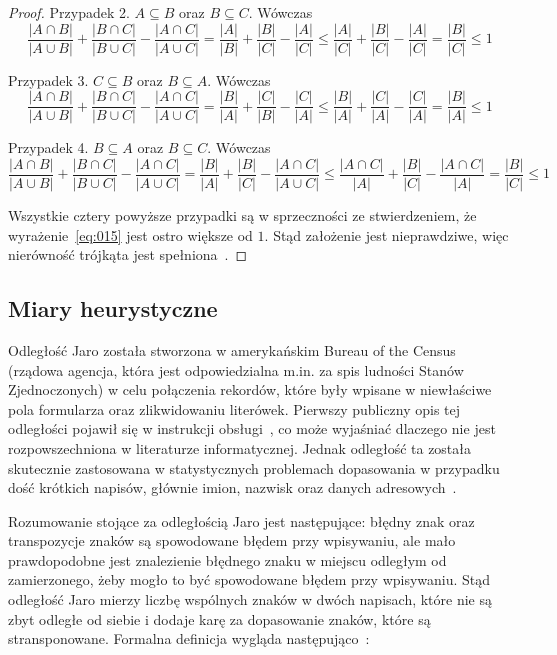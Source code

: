 \documentclass{praca1}
\begin{document}
\begin{proof}
Przypadek 2. $A\subseteq B$ oraz $B \subseteq C$. Wówczas
$$
\frac{|A\cap B|}{|A\cup B|} + \frac{|B\cap C|}{|B\cup C|} - \frac{|A\cap C|}{|A\cup C|} = 
\frac{|A|}{|B|} + \frac{|B|}{|C|} - \frac{|A|}{|C|} \leq 
\frac{|A|}{|C|} + \frac{|B|}{|C|} - \frac{|A|}{|C|} = 
\frac{|B|}{|C|} \leq 1
$$

Przypadek 3. $C\subseteq B$ oraz $B \subseteq A$. Wówczas
$$
\frac{|A\cap B|}{|A\cup B|} + \frac{|B\cap C|}{|B\cup C|} - \frac{|A\cap C|}{|A\cup C|} = 
\frac{|B|}{|A|} + \frac{|C|}{|B|} - \frac{|C|}{|A|} \leq 
\frac{|B|}{|A|} + \frac{|C|}{|A|} - \frac{|C|}{|A|} =
\frac{|B|}{|A|} \leq 1
$$

Przypadek 4. $B\subseteq A$ oraz $B \subseteq C$. Wówczas
$$
\frac{|A\cap B|}{|A\cup B|} + \frac{|B\cap C|}{|B\cup C|} - \frac{|A\cap C|}{|A\cup C|} = 
\frac{|B|}{|A|} + \frac{|B|}{|C|} - \frac{|A\cap C|}{|A\cup C|} \leq 
\frac{|A \cap C|}{|A|} + \frac{|B|}{|C|} - \frac{|A\cap C|}{|A|} =
\frac{|B|}{|C|} \leq 1
$$

Wszystkie cztery powyższe przypadki są w sprzeczności ze stwierdzeniem, że wyrażenie~\eqref{eq:015} jest ostro większe od $1$. Stąd założenie jest nieprawdziwe, więc nierówność trójkąta jest spełniona~\cite{Wilbik2012:distance}.
\end{proof}

\subsection{Miary heurystyczne}


Odległość Jaro została stworzona w amerykańskim Bureau of the Census (rządowa agencja, która jest odpowiedzialna m.in. za spis ludności Stanów Zjednoczonych) w celu połączenia rekordów, które były wpisane w niewłaściwe pola formularza oraz zlikwidowaniu literówek. Pierwszy publiczny opis tej odległości pojawił się w instrukcji obsługi~\cite{Jaro1978:usermanual}, co może wyjaśniać dlaczego nie jest rozpowszechniona w literaturze informatycznej. Jednak odległość ta została skutecznie zastosowana w statystycznych problemach dopasowania w przypadku dość krótkich napisów, głównie imion, nazwisk oraz danych adresowych~\cite{Loo2014:stringdist}.

Rozumowanie stojące za odległością Jaro jest następujące: błędny znak oraz transpozycje znaków są spowodowane błędem przy wpisywaniu, ale mało prawdopodobne jest znalezienie błędnego znaku w miejscu odległym od zamierzonego, żeby mogło to być spowodowane błędem przy wpisywaniu. Stąd odległość Jaro mierzy liczbę wspólnych znaków w dwóch napisach, które nie są zbyt odległe od siebie i dodaje karę za dopasowanie znaków, które są stransponowane. Formalna definicja wygląda następująco~\cite{Loo2014:stringdist}:
\end{document}
